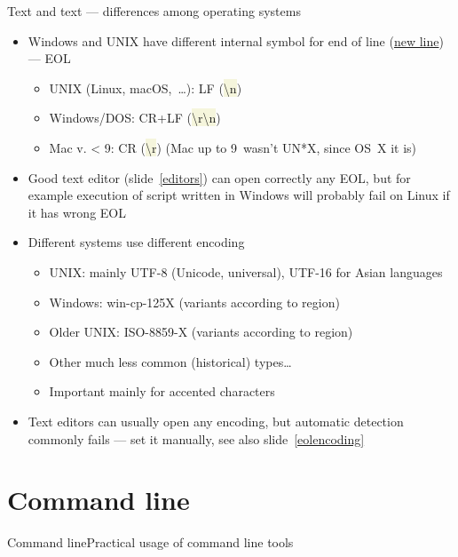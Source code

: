 \documentclass[compress, xelatex, 11pt, xcolor=svgnames, aspectratio=169,
	hyperref={
		bookmarks=true,
		unicode=true,
		colorlinks=true,
		pdftitle={Linux, command line and MetaCentrum},
		plainpages=false,
		pdfauthor={Vojtech Zeisek},
		pdfsubject={Course about use of Linux command line, writing shell scripts and using MetaCentrum of CESNET},
		pdfcreator={XeLaTeX},
		pdfkeywords={Linux, GNU, BASH, shell, command line, MetaCentrum},
		linkcolor=DarkRed, %
		anchorcolor=DarkBlue, %
		citecolor=Indigo, %
		filecolor=NavyBlue, %
		menucolor=DarkMagenta, %
		urlcolor=DarkBlue, %
		},
	url={hyphens, lowtilde} %
	]{beamer}
\renewcommand{\texttt}[1]{\colorbox{Beige}{{\ttfamily #1}}}
\begin{document}
\begin{frame}{Text and text --- differences among operating systems}
	\label{eolenc}
	\begin{itemize}
		\item Windows and UNIX have different internal symbol for end of line (\href{https://en.wikipedia.org/wiki/Newline}{new line}) --- EOL
		\begin{itemize}
			\item UNIX (Linux, macOS,~\ldots): LF (\texttt{\textbackslash n})
			\item Windows/DOS: CR+LF (\texttt{\textbackslash r\textbackslash n})
			\item Mac v. < 9: CR (\texttt{\textbackslash r}) (Mac up to 9~wasn't UN*X, since OS~X it is)
		\end{itemize}
		\item Good text editor (slide~\ref{editors}) can open correctly any EOL, but for example execution of script written in Windows will probably fail on Linux if it has wrong EOL
		\item Different systems use different encoding
		\begin{itemize}
			\item UNIX: mainly UTF-8 (Unicode, universal), UTF-16 for Asian languages
			\item Windows: win-cp-125X (variants according to region)
			\item Older UNIX: ISO-8859-X (variants according to region)
			\item Other much less common (historical) types\ldots
			\item Important mainly for accented characters
		\end{itemize}
		\item Text editors can usually open any encoding, but automatic detection commonly fails --- set it manually, see also slide~\ref{eolencoding}
	\end{itemize}
\end{frame}

\section{Command line}

\begin{frame}[allowframebreaks]{Command line}{Practical usage of command line tools}
	\tableofcontents[currentsection, sectionstyle=show/hide, hideothersubsections]
\end{frame}
\end{document}
